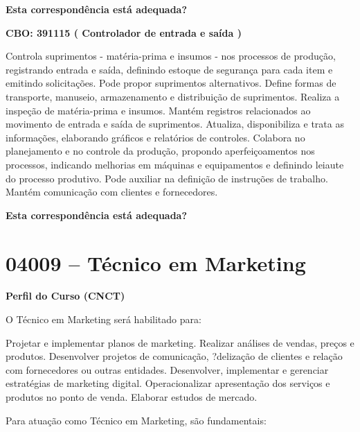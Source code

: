 \documentclass[
]{article}
\begin{document}
\begin{Form}
\textbf{Esta correspondência está adequada?} \\ 
\end{Form}

\textbf{CBO: 391115  ( Controlador de entrada e saída )}

Controla suprimentos - matéria-prima e insumos - nos processos de
produção, registrando entrada e saída, definindo estoque de segurança
para cada item e emitindo solicitações. Pode propor suprimentos
alternativos. Define formas de transporte, manuseio, armazenamento e
distribuição de suprimentos. Realiza a inspeção de matéria-prima e
insumos. Mantém registros relacionados ao movimento de entrada e saída
de suprimentos. Atualiza, disponibiliza e trata as informações,
elaborando gráficos e relatórios de controles. Colabora no planejamento
e no controle da produção, propondo aperfeiçoamentos nos processos,
indicando melhorias em máquinas e equipamentos e definindo leiaute do
processo produtivo. Pode auxiliar na definição de instruções de
trabalho. Mantém comunicação com clientes e fornecedores.

\begin{Form}
\textbf{Esta correspondência está adequada?} \\ 
\end{Form}

\newpage
\section{ 04009 -- Técnico em Marketing }

\textbf{Perfil do Curso (CNCT)}

O Técnico em Marketing será habilitado para:

Projetar e implementar planos de marketing. Realizar análises de vendas,
preços e produtos. Desenvolver projetos de comunicação, ?delização de
clientes e relação com fornecedores ou outras entidades. Desenvolver,
implementar e gerenciar estratégias de marketing digital.
Operacionalizar apresentação dos serviços e produtos no ponto de venda.
Elaborar estudos de mercado.

Para atuação como Técnico em Marketing, são fundamentais:
\end{document}
